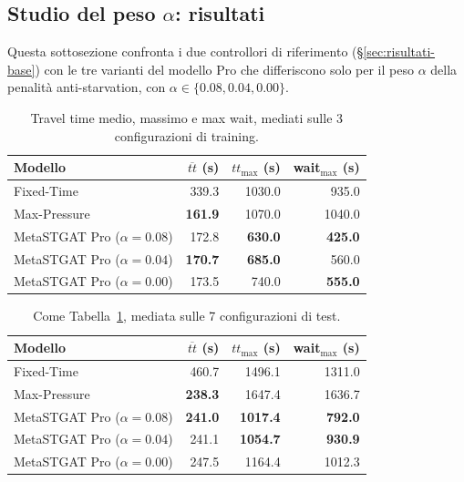 \subsection{Studio del peso \texorpdfstring{$\alpha$}{alpha}: risultati}
\label{sec:risultati-alpha}
\label{sec:equita-alpha}

Questa sottosezione confronta i due controllori di riferimento
(§\ref{sec:risultati-base}) con le tre varianti del modello Pro che
differiscono solo per il peso $\alpha$ della penalità anti-starvation,
con $\alpha \in \{0.08, 0.04, 0.00\}$.

\begin{table}[htbp]
  \centering
  \begin{tabular}{@{}lrrr@{}}
    \toprule
    Modello                       & $\overline{tt}$ (s) & $tt_{\max}$ (s) & wait$_{\max}$ (s) \\
    \midrule
    Fixed-Time                    & 339.3               & 1030.0          & 935.0             \\
    Max-Pressure                  & \textbf{161.9}      & 1070.0          & 1040.0            \\
    MetaSTGAT Pro ($\alpha=0.08$) & 172.8               & \textbf{630.0}  & \textbf{425.0}    \\
    MetaSTGAT Pro ($\alpha=0.04$) & \textbf{170.7}      & \textbf{685.0}  & 560.0             \\
    MetaSTGAT Pro ($\alpha=0.00$) & 173.5               & 740.0           & \textbf{555.0}    \\
    \bottomrule
  \end{tabular}
  \caption{Travel time medio, massimo e max wait, mediati
    sulle 3 configurazioni di training.}
  \label{tab:risultati-train}
\end{table}

\begin{table}[htbp]
  \centering
  \begin{tabular}{@{}lrrr@{}}
    \toprule
    Modello                       & $\overline{tt}$ (s) & $tt_{\max}$ (s) & wait$_{\max}$ (s) \\
    \midrule
    Fixed-Time                    & 460.7               & 1496.1          & 1311.0            \\
    Max-Pressure                  & \textbf{238.3}      & 1647.4          & 1636.7            \\
    MetaSTGAT Pro ($\alpha=0.08$) & \textbf{241.0}      & \textbf{1017.4} & \textbf{792.0}    \\
    MetaSTGAT Pro ($\alpha=0.04$) & 241.1               & \textbf{1054.7} & \textbf{930.9}    \\
    MetaSTGAT Pro ($\alpha=0.00$) & 247.5               & 1164.4          & 1012.3            \\
    \bottomrule
  \end{tabular}
  \caption{Come Tabella~\ref{tab:risultati-train}, mediata sulle 7
    configurazioni di test.}
  \label{tab:risultati-test}
\end{table}

